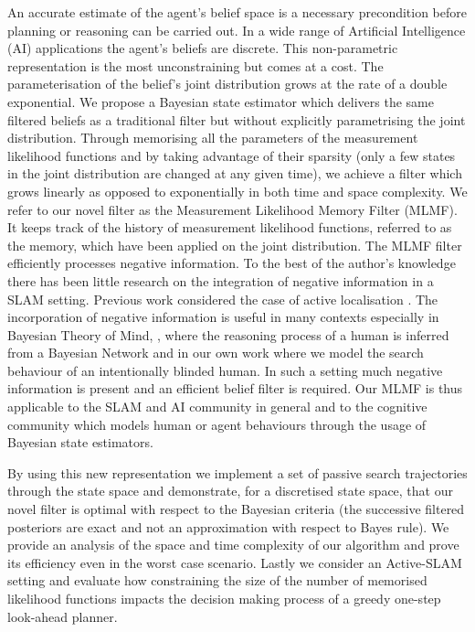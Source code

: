 An accurate estimate of the agent's belief space is a necessary precondition before planning or reasoning can be carried out.
In a wide range of Artificial Intelligence (AI) applications the agent's beliefs are discrete. This non-parametric representation
is the most unconstraining but comes at a cost. The parameterisation of the belief's joint distribution grows at the rate of a double exponential.
We propose a Bayesian state estimator which delivers the same filtered beliefs as a traditional filter but without explicitly parametrising the 
joint distribution. Through memorising all the parameters of the measurement likelihood functions and by taking advantage of 
their sparsity (only a few states in the joint distribution are changed at any given time), we achieve a filter which grows linearly as opposed to exponentially 
in both time and space complexity. We refer to our novel filter as the Measurement Likelihood Memory Filter (MLMF). 
It keeps track of the history of measurement likelihood functions, referred to as the memory, which 
have been applied on the joint distribution.
The MLMF filter efficiently processes negative information. To the best of the author's knowledge there has been little
research on the integration of negative information in a SLAM setting. Previous work considered the case of active localisation \citep{NegInfoFurtherStudies}.
The incorporation of negative information is useful in many contexts especially in Bayesian Theory of Mind, \cite{Bake_Saxe_Tene_2011},
where the reasoning process of a human is inferred from a Bayesian Network and in our own work \cite{deChambrier2013} where we model the 
search behaviour of an intentionally blinded human. In such a setting much negative information is present and an efficient belief filter is required. 
Our MLMF is thus applicable to the SLAM and AI community in general and to the cognitive community which models human or agent behaviours through 
the usage of Bayesian state estimators.

By using this new representation we implement a set of passive search trajectories through the state 
space and demonstrate, for a discretised state space, that our novel filter is optimal with respect to the Bayesian criteria (the successive
filtered posteriors are exact and not an approximation with respect to Bayes rule). We provide an analysis of the space and time complexity of 
our algorithm and prove its efficiency even in the worst case scenario.
Lastly we consider an Active-SLAM setting and evaluate how constraining the size of the number of memorised likelihood 
functions impacts the decision making process of a greedy one-step look-ahead planner.

